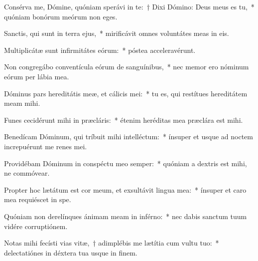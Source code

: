\item Consérva me, Dómine, quóniam sperávi in te:~† Dixi Dómino: Deus meus es tu,~* quóniam bonórum meórum non eges.

\item Sanctis, qui sunt in terra ejus,~* mirificávit omnes voluntátes meas in eis.

\item Multiplicátæ sunt infirmitátes eórum:~* póstea acceleravérunt.

\item Non congregábo conventícula eórum de sanguínibus,~* nec memor ero nóminum eórum per lábia mea.

\item Dóminus pars hereditátis meæ, et cálicis mei:~* tu es, qui restítues hereditátem meam mihi.

\item Funes cecidérunt mihi in præcláris:~* étenim heréditas mea præclára est mihi.

\item Benedícam Dóminum, qui tríbuit mihi intelléctum:~* ínsuper et usque ad noctem increpuérunt me renes mei.

\item Providébam Dóminum in conspéctu meo semper:~* quóniam a dextris est mihi, ne commóvear.

\item Propter hoc lætátum est cor meum, et exsultávit lingua mea:~* ínsuper et caro mea requiéscet in spe.

\item Quóniam non derelínques ánimam meam in inférno:~* nec dabis sanctum tuum vidére corruptiónem.

\item Notas mihi fecísti vias vitæ,~† adimplébis me lætítia cum vultu tuo:~* delectatiónes in déxtera tua usque in finem.
